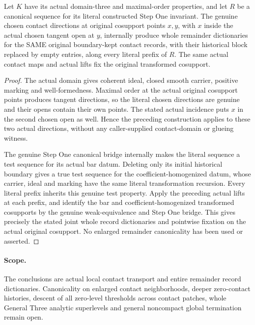 \begin{theorem}
\label{hir:zero-contact-remainder-original-chosen-glueing}
\leanok
{}
Let $K$ have its actual domain-three and maximal-order properties, and
let $R$ be a canonical sequence for its literal constructed Step One
invariant. The genuine chosen contact directions at original cosupport
points $x,y$, with $x$ inside the actual chosen tangent open at $y$,
internally produce whole remainder dictionaries for the SAME original
boundary-kept contact records, with their historical block replaced by
empty entries, along every literal prefix of $R$. The same actual contact maps and
actual lifts fix the original transformed cosupport.
\end{theorem}
\begin{proof}
The actual domain gives coherent ideal, closed smooth carrier, positive
marking and well-formedness. Maximal order at the actual original
cosupport points produces tangent directions, so the literal chosen
directions are genuine and their opens contain their own points. The
stated actual incidence puts $x$ in the second chosen open as well.
Hence the preceding construction applies to these two actual directions,
without any caller-supplied contact-domain or glueing witness.

The genuine Step One canonical bridge internally makes the literal
sequence a test sequence for its actual bar datum. Deleting only its
initial historical boundary gives a true test sequence for the
coefficient-homogenized datum, whose carrier, ideal and marking have
the same literal transformation recursion. Every literal prefix inherits
this genuine test property. Apply the preceding actual lifts at each
prefix, and identify the bar and coefficient-homogenized transformed
cosupports by the genuine weak-equivalence and Step One bridge. This
gives precisely the stated joint whole record dictionaries and pointwise
fixation on the actual original cosupport. No enlarged remainder
canonicality has been used or asserted.
\end{proof}

\paragraph{Scope.}
The conclusions are actual local contact transport and entire remainder
record dictionaries. Canonicality on enlarged contact neighborhoods,
deeper zero-contact histories, descent of all zero-level thresholds
across contact patches, whole General Three analytic superlevels and
general noncompact global termination remain open.
